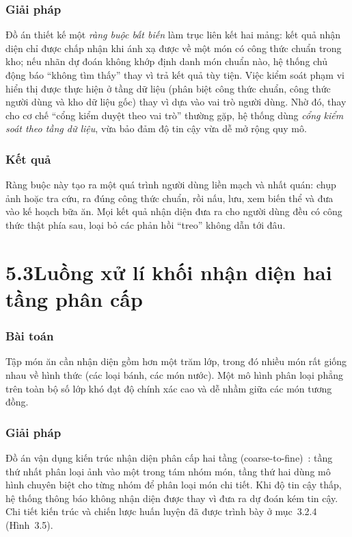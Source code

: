 \documentclass[13pt,a4paper]{article}
\begin{document}
\subsubsection*{Giải pháp}
Đồ án thiết kế một \emph{ràng buộc bất biến} làm trục liên kết hai mảng: kết quả nhận diện chỉ được chấp nhận khi ánh xạ được về một món có công thức chuẩn trong kho; nếu nhãn dự đoán không khớp định danh món chuẩn nào, hệ thống chủ động báo ``không tìm thấy'' thay vì trả kết quả tùy tiện. Việc kiểm soát phạm vi hiển thị được thực hiện ở tầng dữ liệu (phân biệt công thức chuẩn, công thức người dùng và kho dữ liệu gốc) thay vì dựa vào vai trò người dùng. Nhờ đó, thay cho cơ chế ``cổng kiểm duyệt theo vai trò'' thường gặp, hệ thống dùng \emph{cổng kiểm soát theo tầng dữ liệu}, vừa bảo đảm độ tin cậy vừa dễ mở rộng quy mô.

\subsubsection*{Kết quả}
Ràng buộc này tạo ra một quá trình người dùng liền mạch và nhất quán: chụp ảnh hoặc tra cứu, ra đúng công thức chuẩn, rồi nấu, lưu, xem biến thể và đưa vào kế hoạch bữa ăn. Mọi kết quả nhận diện đưa ra cho người dùng đều có công thức thật phía sau, loại bỏ các phản hồi ``treo'' không dẫn tới đâu.

\section*{5.3\quad Luồng xử lí khối nhận diện hai tầng phân cấp}
\subsubsection*{Bài toán}
Tập món ăn cần nhận diện gồm hơn một trăm lớp, trong đó nhiều món rất giống nhau về hình thức (các loại bánh, các món nước). Một mô hình phân loại phẳng trên toàn bộ số lớp khó đạt độ chính xác cao và dễ nhầm giữa các món tương đồng.

\subsubsection*{Giải pháp}
Đồ án vận dụng kiến trúc nhận diện phân cấp hai tầng (coarse-to-fine)~\cite{yan2015hdcnn, zhu2017bcnn}: tầng thứ nhất phân loại ảnh vào một trong tám nhóm món, tầng thứ hai dùng mô hình chuyên biệt cho từng nhóm để phân loại món chi tiết. Khi độ tin cậy thấp, hệ thống thông báo không nhận diện được thay vì đưa ra dự đoán kém tin cậy. Chi tiết kiến trúc và chiến lược huấn luyện đã được trình bày ở mục~3.2.4 (Hình~3.5).
\end{document}
